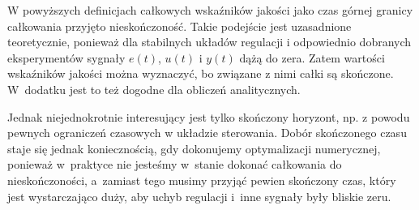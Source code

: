 \documentclass{article}
\begin{document}
        W powyższych definicjach całkowych wskaźników jakości
        jako czas górnej granicy całkowania przyjęto nieskończoność.
        Takie podejście jest uzasadnione teoretycznie, ponieważ dla stabilnych układów regulacji
        i odpowiednio dobranych eksperymentów sygnały $e(t)$, $u(t)$ i $y(t)$ dążą do zera. Zatem wartości wskaźników jakości można wyznaczyć, bo związane z nimi całki są
        skończone. W~dodatku jest to też dogodne dla obliczeń analitycznych.

        Jednak niejednokrotnie interesujący jest tylko skończony horyzont, 
        np. z powodu pewnych ograniczeń czasowych w układzie sterowania.
        Dobór skończonego czasu staje się jednak koniecznością, gdy
        dokonujemy optymalizacji numerycznej, ponieważ w~praktyce nie jesteśmy
        w~stanie dokonać całkowania do nieskończoności, a~zamiast tego musimy
        przyjąć pewien skończony czas, który jest wystarczająco duży, aby uchyb
        regulacji i~inne sygnały były bliskie zeru.

\end{document}
